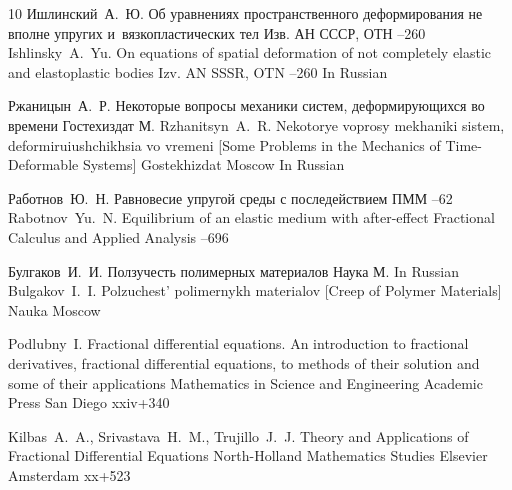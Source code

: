 \begin{thebibliography}{10}
\by Ишлинский~А.~Ю.
\paper Об уравнениях пространственного деформирования не вполне упругих и~вязкопластических тел
\jour Изв. АН СССР, ОТН
–260
\misctransl
\by Ishlinsky~A.~Yu.
\paper On equations of spatial deformation of not completely elastic and elastoplastic bodies
\jour Izv. AN SSSR, OTN
–260
\lang In Russian

\by Ржаницын~А.~Р.
\book Некоторые вопросы механики систем, деформирующихся во времени
\publ Гостехиздат
\publaddr М.
\misctransl
\by Rzhanitsyn~A.~R.
\book Nekotorye voprosy mekhaniki sistem, deformiruiushchikhsia vo vremeni \rm [Some Problems in the Mechanics of Time-Deformable Systems]
\publ Gostekhizdat
\publaddr Moscow
\lang In Russian


\by Работнов~Ю.~Н.
\paper Равновесие упругой среды с последействием
\jour ПММ
--62
\transl
\by Rabotnov~Yu.~N.
\paper Equilibrium of an elastic medium with after-effect
\jour Fractional Calculus and Applied Analysis
--696

\by Булгаков~И.~И.
\book Ползучесть полимерных материалов
\publ Наука
\publaddr М.
\misctransl
\lang In Russian
\by Bulgakov~I.~I.
\book Polzuchest' polimernykh materialov \rm [Creep of Polymer Materials]
\publ Nauka
\publaddr Moscow


\by Podlubny~I.
\book Fractional differential equations. An introduction to fractional derivatives, fractional differential equations, to methods of their solution and some of their applications
\serial Mathematics in Science and Engineering
\publ Academic Press
\publaddr San Diego
\totalpages xxiv+340

\by Kilbas~A.~A., Srivastava~H.~M., Trujillo~J.~J.
\book Theory and Applications of Fractional Differential Equations
\serial North-Holland Mathematics Studies
\publ Elsevier
\publaddr Amsterdam
\totalpages xx+523


\end{thebibliography}
